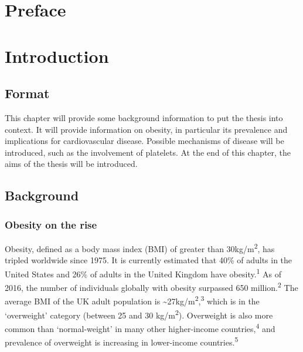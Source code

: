 \documentclass[11pt,twoside]{bristolthesis}
\begin{document}
\mainmatter %
\pagestyle{plain}
\hypertarget{preface}{%
\chapter*{Preface}\label{preface}}

\hypertarget{introduction}{%
\chapter*{Introduction}\label{introduction}}

\hypertarget{format}{%
\section{Format}\label{format}}

This chapter will provide some background information to put the thesis into context. It will provide information on obesity, in particular its prevalence and implications for cardiovascular disease. Possible mechanisms of disease will be introduced, such as the involvement of platelets. At the end of this chapter, the aims of the thesis will be introduced.

\hypertarget{background}{%
\section{Background}\label{background}}

\hypertarget{obesity-on-the-rise}{%
\subsection{Obesity on the rise}\label{obesity-on-the-rise}}

Obesity, defined as a body mass index (BMI) of greater than 30kg/m\textsuperscript{2}, has tripled worldwide since 1975. It is currently estimated that 40\% of adults in the United States and 26\% of adults in the United Kingdom have obesity.\textsuperscript{1} As of 2016, the number of individuals globally with obesity surpassed 650 million.\textsuperscript{2} The average BMI of the UK adult population is \textasciitilde27kg/m\textsuperscript{2},\textsuperscript{3} which is in the `overweight' category (between 25 and 30 kg/m\textsuperscript{2}). Overweight is also more common than `normal-weight' in many other higher-income countries,\textsuperscript{4} and prevalence of overweight is increasing in lower-income countries.\textsuperscript{5}
\end{document}
